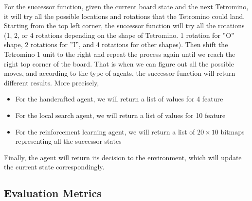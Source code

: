 \documentclass[letterpaper]{article} %
\begin{document}
For the successor function, given the current board state and the next Tetromino, it will try all the possible locations and rotations that the Tetromino could land. Starting from the top left corner, the successor function will try all the rotations (1, 2, or 4 rotations depending on the shape of Tetromino. 1 rotation for ”O” shape, 2 rotations for ”I”, and 4 rotations for other shapes). Then shift the Tetromino 1 unit to the right and repeat the process again until we reach the right top corner of the board. That is when we can figure out all the possible moves, and according to the type of agents, the successor function will return different results. More precisely,
\begin{itemize}
  \item 
  For the handcrafted agent, we will return a list of values for 4 feature
  \item 
  For the local search agent, we will return a list of values for 10 feature
  \item 
  For the reinforcement learning agent, we will return a list of $20\times 10$ bitmaps representing all the successor states
\end{itemize}
Finally, the agent will return its decision to the environment, which will update the current state correspondingly.



\subsection{Evaluation Metrics}
\end{document}
